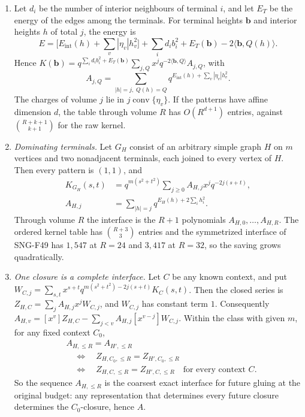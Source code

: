 \documentclass[
  11pt,
  a4paper,
]{report}
\begin{document}
\begin{enumerate}
\def\labelenumi{(\alph{enumi})}
\item
  Let \(d_i\) be the number of interior neighbours of terminal \(i\),
  and let \(E_T\) be the energy of the edges among the terminals. For
  terminal heights \(\mathbf b\) and interior heights \(h\) of total
  \(j\), the energy is \[
  E=\bigl[E_{\mathrm{int}}(h)+\sum_v|\eta_v|h_v^2\bigr]+\sum_id_ib_i^2+E_T(\mathbf b)-2\langle\mathbf b,Q(h)\rangle.
  \] Hence
  \(K(\mathbf b)=q^{\sum_id_ib_i^2+E_T(\mathbf b)}\sum_{j,Q}x^jq^{-2\langle\mathbf b,Q\rangle}A_{j,Q}\),
  with \[
  A_{j,Q}=\sum_{|h|=j,\;Q(h)=Q}q^{E_{\mathrm{int}}(h)+\sum_v|\eta_v|h_v^2}.
  \] The charges of volume \(j\) lie in
  \(j\operatorname{conv}\{\eta_v\}\). If the patterns have affine
  dimension \(d\), the table through volume \(R\) has \(O(R^{d+1})\)
  entries, against \(\binom{R+k+1}{k+1}\) for the raw kernel.
\item
  \emph{Dominating terminals.} Let \(G_H\) consist of an arbitrary
  simple graph \(H\) on \(m\) vertices and two nonadjacent terminals,
  each joined to every vertex of \(H\). Then every pattern is \((1,1)\),
  and \[
  \begin{aligned}
  K_{G_H}(s,t)&=q^{m(s^2+t^2)}\sum_{j\ge0}A_{H,j}x^jq^{-2j(s+t)},\\
  A_{H,j}&=\sum_{|h|=j}q^{E_H(h)+2\sum_ih_i^2}.
  \end{aligned}
  \] Through volume \(R\) the interface is the \(R+1\) polynomials
  \(A_{H,0},\ldots,A_{H,R}\). The ordered kernel table has
  \(\binom{R+3}3\) entries and the symmetrized interface of SNG-F49 has
  \(1{,}547\) at \(R=24\) and \(3{,}417\) at \(R=32\), so the saving
  grows quadratically.
\item
  \emph{One closure is a complete interface.} Let \(C\) be any known
  context, and put
  \(W_{C,j}=\sum_{s,t}x^{s+t}q^{m(s^2+t^2)-2j(s+t)}K_C(s,t)\). Then the
  closed series is \(Z_{H,C}=\sum_jA_{H,j}x^jW_{C,j}\), and \(W_{C,j}\)
  has constant term \(1\). Consequently
  \(A_{H,v}=[x^v]Z_{H,C}-\sum_{j<v}A_{H,j}[x^{v-j}]W_{C,j}\). Within the
  class with given \(m\), for any fixed context \(C_0\), \[
  \begin{aligned}
  &A_{H,\le R}=A_{H',\le R}\\
  &\quad\Longleftrightarrow\quad Z_{H,C_0,\le R}=Z_{H',C_0,\le R}\\
  &\quad\Longleftrightarrow\quad Z_{H,C,\le R}=Z_{H',C,\le R}
  \quad\text{for every context }C.
  \end{aligned}
  \] So the sequence \(A_{H,\le R}\) is the coarsest exact interface for
  future gluing at the original budget: any representation that
  determines every future closure determines the \(C_0\)-closure, hence
  \(A\).
\end{enumerate}
\end{document}
